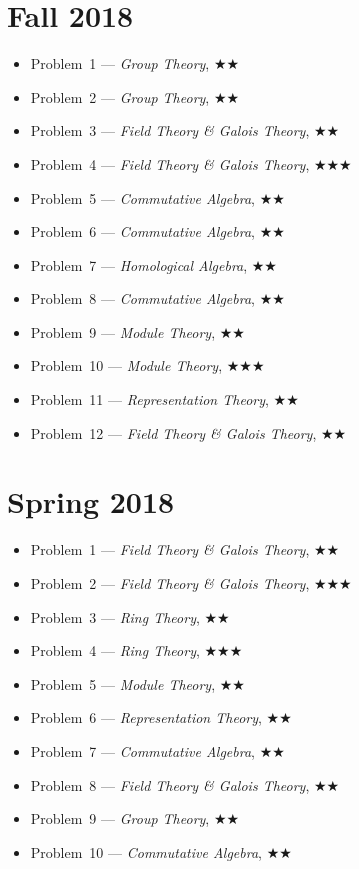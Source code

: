 \documentclass[11pt,letterpaper]{book}
\begin{document}
\section*{Fall 2018}
\begin{itemize}
\item Problem~1 --- \textit{Group Theory}, $\bigstar\bigstar$
\item Problem~2 --- \textit{Group Theory}, $\bigstar\bigstar$
\item Problem~3 --- \textit{Field Theory \& Galois Theory}, $\bigstar\bigstar$
\item Problem~4 --- \textit{Field Theory \& Galois Theory}, $\bigstar\bigstar\bigstar$
\item Problem~5 --- \textit{Commutative Algebra}, $\bigstar\bigstar$
\item Problem~6 --- \textit{Commutative Algebra}, $\bigstar\bigstar$
\item Problem~7 --- \textit{Homological Algebra}, $\bigstar\bigstar$
\item Problem~8 --- \textit{Commutative Algebra}, $\bigstar\bigstar$
\item Problem~9 --- \textit{Module Theory}, $\bigstar\bigstar$
\item Problem~10 --- \textit{Module Theory}, $\bigstar\bigstar\bigstar$
\item Problem~11 --- \textit{Representation Theory}, $\bigstar\bigstar$
\item Problem~12 --- \textit{Field Theory \& Galois Theory}, $\bigstar\bigstar$
\end{itemize}

\section*{Spring 2018}
\begin{itemize}
\item Problem~1 --- \textit{Field Theory \& Galois Theory}, $\bigstar\bigstar$
\item Problem~2 --- \textit{Field Theory \& Galois Theory}, $\bigstar\bigstar\bigstar$
\item Problem~3 --- \textit{Ring Theory}, $\bigstar\bigstar$
\item Problem~4 --- \textit{Ring Theory}, $\bigstar\bigstar\bigstar$
\item Problem~5 --- \textit{Module Theory}, $\bigstar\bigstar$
\item Problem~6 --- \textit{Representation Theory}, $\bigstar\bigstar$
\item Problem~7 --- \textit{Commutative Algebra}, $\bigstar\bigstar$
\item Problem~8 --- \textit{Field Theory \& Galois Theory}, $\bigstar\bigstar$
\item Problem~9 --- \textit{Group Theory}, $\bigstar\bigstar$
\item Problem~10 --- \textit{Commutative Algebra}, $\bigstar\bigstar$
\end{itemize}
\end{document}
